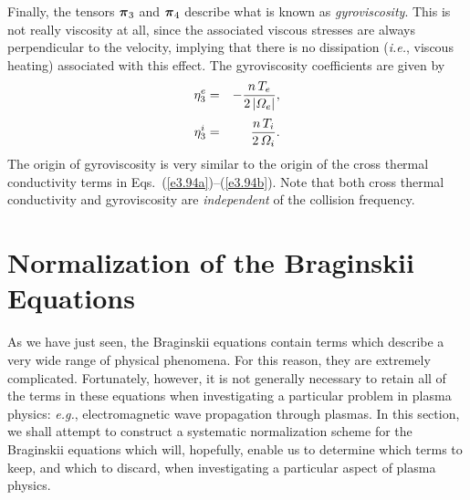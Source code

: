 Finally, the tensors $\mbox{\boldmath$\pi$}_3$ and $\mbox{\boldmath$\pi$}_4$ describe what is known
as {\em gyroviscosity}. This is not really viscosity at all, since the
associated viscous stresses are always perpendicular to the velocity, implying that
there is no dissipation ({\em i.e.}, viscous heating) associated with
this effect. The gyroviscosity coefficients are given by 
\begin{eqnarray}
\eta_3^e &=& -\frac{n\,T_e}{2\,|{\mit\Omega}_e|} ,\\[0.5ex]
\eta_3^i &=& \frac{n\,T_i}{2\,{\mit\Omega}_i}.
\end{eqnarray}
The origin of gyroviscosity is very similar to the origin of the
cross thermal conductivity terms in Eqs.~(\ref{e3.94a})--(\ref{e3.94b}). Note that both
cross thermal conductivity and gyroviscosity are {\em independent}\/
of the collision frequency. 

\section{Normalization of the Braginskii Equations}\label{s3.9}
As we have just seen, the Braginskii equations contain terms which describe a
very wide range of physical phenomena. For this reason, they are
extremely complicated. Fortunately, however, it is not generally 
necessary to retain all of
the terms in these equations when investigating a particular
problem in plasma physics: {\em e.g.}, electromagnetic wave propagation
through plasmas. In this section, we shall attempt to construct a systematic
normalization scheme for the Braginskii equations which will, hopefully, enable us
to determine which terms to keep, and which to discard, when investigating
a particular aspect of plasma physics. 

